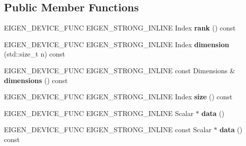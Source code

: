 \subsection*{Public Member Functions}
\begin{DoxyCompactItemize}
\item 
\mbox{\label{class_eigen_1_1_tensor_fixed_size_a9bd827e74e66c5ad8e1139750f932296}} 
E\+I\+G\+E\+N\+\_\+\+D\+E\+V\+I\+C\+E\+\_\+\+F\+U\+NC E\+I\+G\+E\+N\+\_\+\+S\+T\+R\+O\+N\+G\+\_\+\+I\+N\+L\+I\+NE Index {\bfseries rank} () const
\item 
\mbox{\label{class_eigen_1_1_tensor_fixed_size_aa46081bc3fcbd0642d46ec16b2376843}} 
E\+I\+G\+E\+N\+\_\+\+D\+E\+V\+I\+C\+E\+\_\+\+F\+U\+NC E\+I\+G\+E\+N\+\_\+\+S\+T\+R\+O\+N\+G\+\_\+\+I\+N\+L\+I\+NE Index {\bfseries dimension} (std\+::size\+\_\+t n) const
\item 
\mbox{\label{class_eigen_1_1_tensor_fixed_size_a8bdec2696da4981b00f5721e022f37fa}} 
E\+I\+G\+E\+N\+\_\+\+D\+E\+V\+I\+C\+E\+\_\+\+F\+U\+NC E\+I\+G\+E\+N\+\_\+\+S\+T\+R\+O\+N\+G\+\_\+\+I\+N\+L\+I\+NE const Dimensions \& {\bfseries dimensions} () const
\item 
\mbox{\label{class_eigen_1_1_tensor_fixed_size_a96dd0e6a1d15323384f1600b512a9fac}} 
E\+I\+G\+E\+N\+\_\+\+D\+E\+V\+I\+C\+E\+\_\+\+F\+U\+NC E\+I\+G\+E\+N\+\_\+\+S\+T\+R\+O\+N\+G\+\_\+\+I\+N\+L\+I\+NE Index {\bfseries size} () const
\item 
\mbox{\label{class_eigen_1_1_tensor_fixed_size_ae1267be644159b8c4926cc4f62f91a2a}} 
E\+I\+G\+E\+N\+\_\+\+D\+E\+V\+I\+C\+E\+\_\+\+F\+U\+NC E\+I\+G\+E\+N\+\_\+\+S\+T\+R\+O\+N\+G\+\_\+\+I\+N\+L\+I\+NE Scalar $\ast$ {\bfseries data} ()
\item 
\mbox{\label{class_eigen_1_1_tensor_fixed_size_ae0368ca41415f66f57fead86ea49d332}} 
E\+I\+G\+E\+N\+\_\+\+D\+E\+V\+I\+C\+E\+\_\+\+F\+U\+NC E\+I\+G\+E\+N\+\_\+\+S\+T\+R\+O\+N\+G\+\_\+\+I\+N\+L\+I\+NE const Scalar $\ast$ {\bfseries data} () const
\item 
\mbox{\label{class_eigen_1_1_tensor_fixed_size_a5be0375818cc7dfe18237ac24515cf4a}} 

\end{DoxyCompactItemize}
